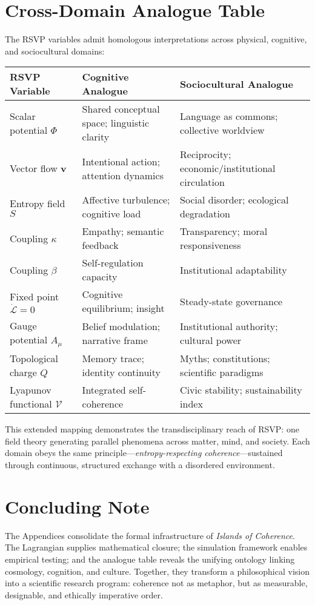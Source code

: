 \documentclass[12pt,a4paper]{article}
\begin{document}
\section{Cross-Domain Analogue Table}
The RSVP variables admit homologous interpretations across physical, cognitive, and sociocultural domains:
\begin{center}
\begin{tabular}{@{}p{4.2cm}p{4.8cm}p{6.5cm}@{}}
\toprule
\textbf{RSVP Variable} & \textbf{Cognitive Analogue} & \textbf{Sociocultural Analogue}\\
\midrule
Scalar potential $\Phi$ &
Shared conceptual space; linguistic clarity &
Language as commons; collective worldview \\[6pt]
Vector flow $\bm{v}$ &
Intentional action; attention dynamics &
Reciprocity; economic/institutional circulation \\[6pt]
Entropy field $S$ &
Affective turbulence; cognitive load &
Social disorder; ecological degradation \\[6pt]
Coupling $\kappa$ &
Empathy; semantic feedback &
Transparency; moral responsiveness \\[6pt]
Coupling $\beta$ &
Self-regulation capacity &
Institutional adaptability \\[6pt]
Fixed point $\dot{\mathcal{L}}=0$ &
Cognitive equilibrium; insight &
Steady-state governance \\[6pt]
Gauge potential $A_\mu$ &
Belief modulation; narrative frame &
Institutional authority; cultural power \\[6pt]
Topological charge $Q$ &
Memory trace; identity continuity &
Myths; constitutions; scientific paradigms \\[6pt]
Lyapunov functional $\mathcal{V}$ &
Integrated self-coherence &
Civic stability; sustainability index \\
\bottomrule
\end{tabular}
\end{center}
This extended mapping demonstrates the transdisciplinary reach of RSVP: one field theory generating parallel phenomena across matter, mind, and society. Each domain obeys the same principle—\emph{entropy-respecting coherence}—sustained through continuous, structured exchange with a disordered environment.

\section*{Concluding Note}
The Appendices consolidate the formal infrastructure of \emph{Islands of Coherence}. The Lagrangian supplies mathematical closure; the simulation framework enables empirical testing; and the analogue table reveals the unifying ontology linking cosmology, cognition, and culture. Together, they transform a philosophical vision into a scientific research program: coherence not as metaphor, but as measurable, designable, and ethically imperative order.

\printbibliography
\end{document}
